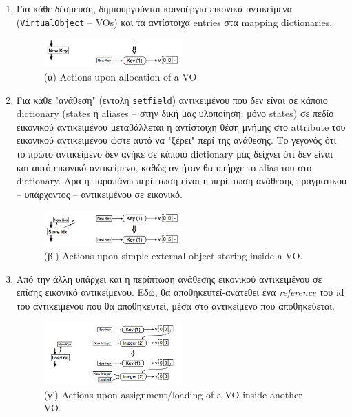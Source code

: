 \begin{enumerate}[label=\alph*]

\item Για κάθε δέσμευση, δημιουργούνται καινούργια εικονικά αντικείμενα \\
(\texttt{VirtualObject} – VOs) και τα αντίστοιχα entries στα mapping
dictionaries.

\begin{figure}[h]
\centering
\includegraphics[width=0.5\textwidth]{virtual-alloc.png}
\caption{(ά) Actions upon allocation of a VO.}
\label{figure-21}
\end{figure}

\item Για κάθε "ανάθεση" (εντολή \texttt{setfield}) αντικειμένου που δεν είναι
σε κάποιο dictionary (states ή aliases – στην δική μας υλοποίηση: μόνο states)
σε πεδίο εικονικού αντικειμένου μεταβάλλεται η αντίστοιχη θέση μνήμης στο
attribute του εικονικού αντικειμένου ώστε αυτό να "ξέρει" περί της ανάθεσης. Το
γεγονός ότι το πρώτο αντικείμενο δεν ανήκε σε κάποιο dictionary μας δείχνει ότι
δεν είναι και αυτό εικονικό αντικείμενο, καθώς αν ήταν θα υπήρχε το alias του
στο dictionary. Αρα η παραπάνω περίπτωση είναι η περίπτωση ανάθεσης πραγματικού
– υπάρχοντος – αντικειμένου σε εικονικό.

\begin{figure}[h]
\centering
\includegraphics[width=0.5\textwidth]{virtual-ext-store.png}
\caption{(β') Actions upon simple external object storing inside a VO.}
\label{figure-22}
\end{figure}

\item Από την άλλη υπάρχει και η περίπτωση ανάθεσης εικονικού αντικειμένου σε
επίσης εικονικό αντικείμενου. Εδώ, θα αποθηκευτεί-ανατεθεί ένα
\textit{reference} του id του αντικειμένου που θα αποθηκευτεί, μέσα στο
αντικείμενο που αποθηκεύεται.

\begin{figure}[h]
\centering
\includegraphics[width=0.5\textwidth]{virtual-virtual-load.png}
\caption{(γ') Actions upon assignment/loading of a VO inside another VO.}
\label{figure-23}
\end{figure}


\end{enumerate}
